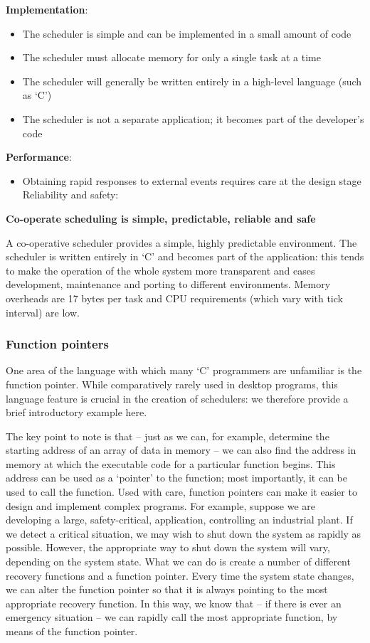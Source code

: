 \textbf{Implementation}:
\begin{itemize}
    \item The scheduler is simple and can be implemented in a small amount of code
    \item The scheduler must allocate memory for only a single task at a time
    \item The scheduler will generally be written entirely in a high-level language (such as ‘C’)
   \item The scheduler is not a separate application; it becomes part of the developer’s code
\end{itemize}


\textbf{Performance}:
\begin{itemize}
    \item Obtaining rapid responses to external events requires care at the design stage
Reliability and safety:

\end{itemize}

\textbf{Co-operate scheduling is simple, predictable, reliable and safe}

A co-operative scheduler provides a simple, highly predictable environment. The
scheduler is written entirely in ‘C’ and becomes part of the application: this tends to
make the operation of the whole system more transparent and eases development,
maintenance and porting to different environments. Memory overheads are 17
bytes per task and CPU requirements (which vary with tick interval) are low.

\subsubsection{Function pointers}
One area of the language with which many `C' programmers are unfamiliar is the
function pointer. While comparatively rarely used in desktop programs, this language
feature is crucial in the creation of schedulers: we therefore provide a brief introductory example here.

The key point to note is that – just as we can, for example, determine the starting
address of an array of data in memory – we can also find the address in memory at
which the executable code for a particular function begins. This address can be used
as a ‘pointer’ to the function; most importantly, it can be used to call the function.
Used with care, function pointers can make it easier to design and implement complex programs. For example, suppose we are developing a large, safety-critical,
application, controlling an industrial plant. If we detect a critical situation, we may
wish to shut down the system as rapidly as possible. However, the appropriate way to
shut down the system will vary, depending on the system state. What we can do is
create a number of different recovery functions and a function pointer. Every time
the system state changes, we can alter the function pointer so that it is always pointing to the most appropriate recovery function. In this way, we know that – if there is
ever an emergency situation – we can rapidly call the most appropriate function, by
means of the function pointer.

